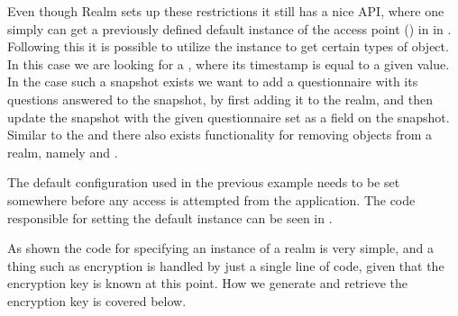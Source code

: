 Even though Realm sets up these restrictions it still has a nice API, where one simply can get a previously defined default instance of the access point () in  in . Following this it is possible to utilize the instance to get certain types of object. In this case we are looking for a , where its timestamp is equal to a given value. In the case such a snapshot exists we want to add a questionnaire with its questions answered to the snapshot, by first adding it to the realm, and then update the snapshot with the given questionnaire set as a field on the snapshot. Similar to the  and  there also exists functionality for removing objects from a realm, namely  and .


The default configuration used in the previous example needs to be set somewhere before any access is attempted from the application. The code responsible for setting the default instance can be seen in . 



As shown the code for specifying an instance of a realm is very simple, and a thing such as encryption is handled by just a single line of code, given that the encryption key is known at this point. How we generate and retrieve the encryption key is covered below. 

